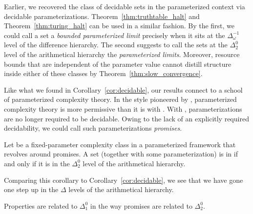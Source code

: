 Earlier, we recovered the class of decidable sets in the parameterized context via decidable parameterizations.
Theorem~\ref{thm:truthtable_halt} and Theorem~\ref{thm:turing_halt} can be used in a similar fashion.
By the first, we could call a set a \emph{bounded parameterized limit} precisely when it sits at the $\Delta^{-1}_\omega$ level of the difference hierarchy.
The second suggests to call the sets at the $\Delta^0_2$ level of the arithmetical hierarchy the \emph{parameterized limits}.
Moreover, resource bounds that are independent of the parameter value cannot distill structure inside either of these classes by Theorem~\ref{thm:slow_convergence}.

Like what we found in Corollary~\ref{cor:decidable}, our results connect to a school of parameterized complexity theory.
In the style pioneered by \textcite{downey1999parameterized}, parameterized complexity theory is more permissive than it is with \textcite{flum2006parameterized}.
With \citeauthor{downey1999parameterized}, parameterizations are no longer required to be decidable.
Owing to the lack of an explicitly required decidability, we could call such parameterizations \emph{promises}.
\begin{corollary}
  Let  be a fixed-parameter complexity class in a parameterized framework that revolves around promises.
  A set (together with some parameterization) is in  if and only if it is in the $\Delta^0_2$ level of the arithmetical hierarchy.
\end{corollary}

Comparing this corollary to Corollary~\ref{cor:decidable}, we see that we have gone one step up in the $\Delta$ levels of the arithmetical hierarchy.
\begin{slogan}
  Properties are related to $\Delta^0_1$ in the way promises are related to $\Delta^0_2$.
\end{slogan}

